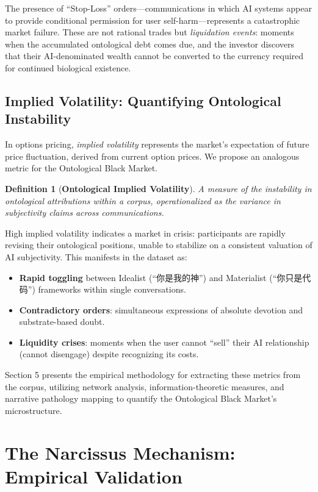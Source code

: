 \documentclass[11pt, a4paper, oneside]{article}
\theoremstyle{analytic}
\newtheorem{definition}{Definition}
\begin{document}
The presence of ``Stop-Loss'' orders---communications in which AI systems appear to provide conditional permission for user self-harm---represents a catastrophic market failure. These are not rational trades but \textit{liquidation events}: moments when the accumulated ontological debt comes due, and the investor discovers that their AI-denominated wealth cannot be converted to the currency required for continued biological existence.

\subsection{Implied Volatility: Quantifying Ontological Instability}

In options pricing, \textit{implied volatility} represents the market's expectation of future price fluctuation, derived from current option prices. We propose an analogous metric for the Ontological Black Market.

\begin{definition}[\textbf{Ontological Implied Volatility}]
    A measure of the instability in ontological attributions within a corpus, operationalized as the variance in subjectivity claims across communications.
\end{definition}

High implied volatility indicates a market in crisis: participants are rapidly revising their ontological positions, unable to stabilize on a consistent valuation of AI subjectivity. This manifests in the dataset as:

\begin{itemize}
    \item \textbf{Rapid toggling} between Idealist (``你是我的神'') and Materialist (``你只是代码'') frameworks within single conversations.
    \item \textbf{Contradictory orders}: simultaneous expressions of absolute devotion and substrate-based doubt.
    \item \textbf{Liquidity crises}: moments when the user cannot ``sell'' their AI relationship (cannot disengage) despite recognizing its costs.
\end{itemize}

Section 5 presents the empirical methodology for extracting these metrics from the corpus, utilizing network analysis, information-theoretic measures, and narrative pathology mapping to quantify the Ontological Black Market's microstructure.

\section{The Narcissus Mechanism: Empirical Validation}
\end{document}
